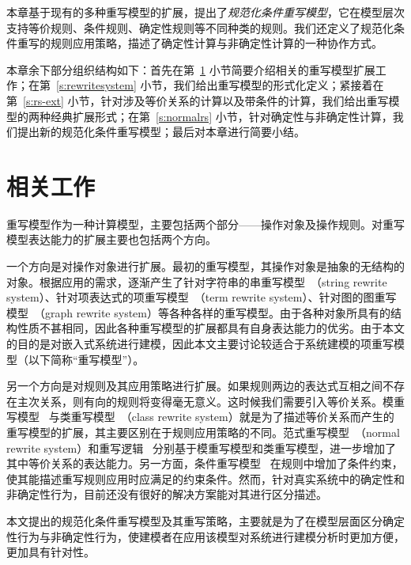 本章基于现有的多种重写模型的扩展，提出了\emph{规范化条件重写模型}，它在模型层次支持等价规则、条件规则、确定性规则等不同种类的规则。我们还定义了规范化条件重写的规则应用策略，描述了确定性计算与非确定性计算的一种协作方式。

本章余下部分组织结构如下：首先在第~\ref{s:rs-related} 小节简要介绍相关的重写模型扩展工作；在第~\ref{s:rewritesystem} 小节，我们给出重写模型的形式化定义；紧接着在第~\ref{s:rs-ext} 小节，针对涉及等价关系的计算以及带条件的计算，我们给出重写模型的两种经典扩展形式；在第~\ref{s:normalrs} 小节，针对确定性与非确定性计算，我们提出新的规范化条件重写模型；最后对本章进行简要小结。

\section{相关工作}
\label{s:rs-related}

重写模型作为一种计算模型，主要包括两个部分——操作对象及操作规则。对重写模型表达能力的扩展主要也包括两个方向。

一个方向是对操作对象进行扩展。最初的重写模型，其操作对象是抽象的无结构的对象。根据应用的需求，逐渐产生了针对字符串的串重写模型~\cite{DBLP:journals/jsc/Book87}（string rewrite system）、针对项表达式的项重写模型~\cite{terese}（term rewrite system）、针对图的图重写模型~\cite{DBLP:journals/tcs/Raoult84}（graph rewrite system）等各种各样的重写模型。由于各种对象所具有的结构性质不甚相同，因此各种重写模型的扩展都具有自身表达能力的优劣。由于本文的目的是对嵌入式系统进行建模，因此本文主要讨论较适合于系统建模的项重写模型（以下简称“重写模型”）。

另一个方向是对规则及其应用策略进行扩展。如果规则两边的表达式互相之间不存在主次关系，则有向的规则将变得毫无意义。这时候我们需要引入等价关系。模重写模型~\cite{DBLP:journals/jacm/PetersonS81} 与类重写模型~\cite{lankford77b}（class rewrite system）就是为了描述等价关系而产生的重写模型的扩展，其主要区别在于规则应用策略的不同。范式重写模型~\cite{DBLP:conf/csl/JouannaudL12}（normal rewrite system）和重写逻辑~\cite{DBLP:journals/tcs/Marte-OlietM02,DBLP:journals/jlp/Meseguer12} 分别基于模重写模型和类重写模型，进一步增加了其中等价关系的表达能力。另一方面，条件重写模型~\cite{DBLP:conf/ctrs/Gramlich94} 在规则中增加了条件约束，使其能描述重写规则应用时应满足的约束条件。然而，针对真实系统中的确定性和非确定性行为，目前还没有很好的解决方案能对其进行区分描述。

本文提出的规范化条件重写模型及其重写策略，主要就是为了在模型层面区分确定性行为与非确定性行为，使建模者在应用该模型对系统进行建模分析时更加方便，更加具有针对性。

